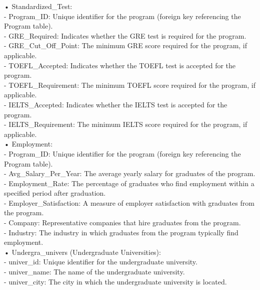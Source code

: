 \documentclass[12pt, a4paper]{article}
\begin{document}
\begin{spacing}{1.32}
\noindent
• Standardized\_Test:\\
- Program\_ID: Unique identifier for the program (foreign key referencing the Program table).\\
- GRE\_Required: Indicates whether the GRE test is required for the program.\\
- GRE\_Cut\_Off\_Point: The minimum GRE score required for the program, if applicable.\\
- TOEFL\_Accepted: Indicates whether the TOEFL test is accepted for the program.\\
- TOEFL\_Requirement: The minimum TOEFL score required for the program, if applicable.\\
- IELTS\_Accepted: Indicates whether the IELTS test is accepted for the program.\\
- IELTS\_Requirement: The minimum IELTS score required for the program, if applicable.\\

\noindent
• Employment:\\
- Program\_ID: Unique identifier for the program (foreign key referencing the Program table).\\
- Avg\_Salary\_Per\_Year: The average yearly salary for graduates of the program.\\
- Employment\_Rate: The percentage of graduates who find employment within a specified period after graduation.\\
- Employer\_Satisfaction: A measure of employer satisfaction with graduates from the program.\\
- Company: Representative companies that hire graduates from the program.\\
- Industry: The industry in which graduates from the program typically find employment.\\

\noindent
• Undergra\_univers (Undergraduate Universities):\\
- univer\_id: Unique identifier for the undergraduate university.\\
- univer\_name: The name of the undergraduate university.\\
- univer\_city: The city in which the undergraduate university is located.\\


\end{spacing}
\end{document}
